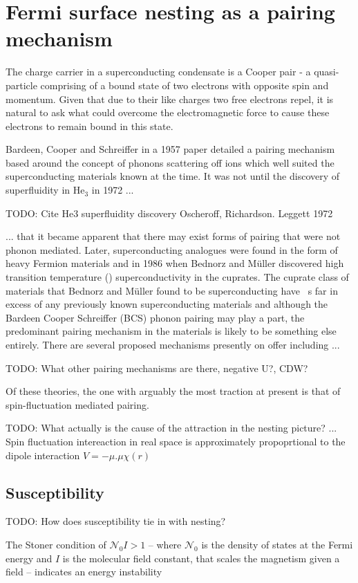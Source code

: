
\section{Fermi surface nesting as a pairing mechanism}

The charge carrier in a superconducting condensate is a Cooper pair - a quasi-particle comprising of a bound state of two electrons with opposite spin and momentum. Given that due to their like charges two free electrons repel, it is natural to ask what could overcome the electromagnetic force to cause these electrons to remain bound in this state.

Bardeen, Cooper and Schreiffer in a 1957 paper\cite{Bardeen1957} detailed a pairing mechanism based around the concept of phonons scattering off ions which well suited the superconducting materials known at the time. It was not until the discovery of superfluidity in He$_3$ in 1972 ...

TODO: Cite He3 superfluidity discovery Oscheroff, Richardson. Leggett 1972

... that it became apparent that there may exist forms of pairing that were not phonon mediated. Later, superconducting analogues were found in the form of heavy Fermion materials and in 1986 when Bednorz and M\"uller\cite{Bednorz} discovered high transition temperature (\Tc) superconductivity in the cuprates. The cuprate class of materials that Bednorz and M\"uller found to be superconducting have \Tc~s far in excess of any previously known superconducting materials and although the Bardeen Cooper Schreiffer (BCS) phonon pairing may play a part, the predominant pairing mechanism in the \highTc materials is likely to be something else entirely\cite{Mazin2008}. There are several proposed mechanisms presently on offer including ...

TODO: What other pairing mechanisms are there, negative U?, CDW?

Of these theories, the one with arguably the most traction at present is that of spin-fluctuation mediated pairing. 

TODO: What actually is the cause of the attraction in the nesting picture? ... Spin fluctuation intereaction in real space is approximately propoprtional to the dipole interaction $V=-\mu . \mu \chi(r)$\cite{Bergemann2003} 

\subsection{Susceptibility}
    \label{Sec:1:NestingSusceptibility}

TODO: How does susceptibility tie in with nesting?




The Stoner condition of $\mathcal{N}_0 I > 1$ -- where $\mathcal{N}_0$ is the density of states at the Fermi energy and $I$ is the molecular field constant, that scales the magnetism given a field -- indicates an energy instability\cite{Kubler2000}
